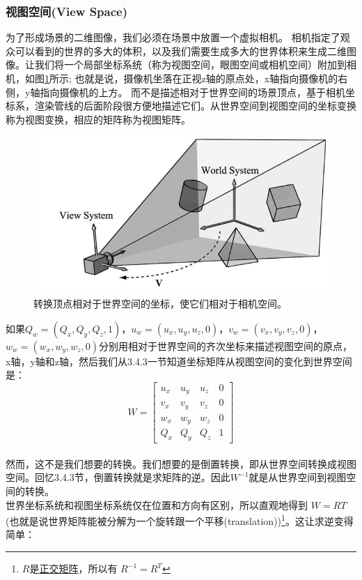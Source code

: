 \documentclass[11pt,a4paper,oldfontcommands]{memoir}
\begin{document}
{\subsubsection{视图空间(View Space)}
\begin{flushleft}
为了形成场景的二维图像，我们必须在场景中放置一个虚拟相机。 相机指定了观众可以看到的世界的多大的体积，以及我们需要生成多大的世界体积来生成二维图像。让我们将一个局部坐标系统（称为视图空间，眼图空间或相机空间）附加到相机，如图\ref{fig:5-19}所示; 也就是说，摄像机坐落在正视z轴的原点处，x轴指向摄像机的右侧，y轴指向摄像机的上方。 而不是描述相对于世界空间的场景顶点，基于相机坐标系，渲染管线的后面阶段很方便地描述它们。从世界空间到视图空间的坐标变换称为视图变换，相应的矩阵称为视图矩阵。\\
\begin{figure}[t]
    \includegraphics[width=\textwidth]{5-19}
    \centering
    \caption{转换顶点相对于世界空间的坐标，使它们相对于相机空间。}
    \label{fig:5-19}
\end{figure}
如果$Q_{w}=(Q_{x},Q_{y},Q_{z},1)$，$u_{w}=(u_{x},u_{y},u_{z},0)$，$v_{w}=(v_{x},v_{y},v_{z},0)$，$w_{w}=(w_{x},w_{y},w_{z},0)$分别用相对于世界空间的齐次坐标来描述视图空间的原点，x轴，y轴和z轴，然后我们从3.4.3一节知道坐标矩阵从视图空间的变化到世界空间是：
$$W=
\begin{bmatrix}
u_{x} & u_{y} & u_{z} & 0\\
v_{x} & v_{y} & v_{z} & 0\\
w_{x} & w_{y} & w_{z} & 0\\
Q_{x} & Q_{y} & Q_{z} & 1
\end{bmatrix}$$\\
然而，这不是我们想要的转换。我们想要的是倒置转换，即从世界空间转换成视图空间。回忆3.4.3节，倒置转换就是求矩阵的逆。因此$W^{-1}$就是从世界空间到视图空间的转换。\\
世界坐标系统和视图坐标系统仅在位置和方向有区别，所以直观地得到 $W=RT$(也就是说世界矩阵能被分解为一个旋转跟一个平移(translation))\footnote{$R$是\href{https://en.wikipedia.org/wiki/Orthogonal_matrix}{\textcolor{linkColor}{正交矩阵}}，所以有 $R^{-1}=R^{T}$}。这让求逆变得简单：

\end{flushleft}}
\end{document}
